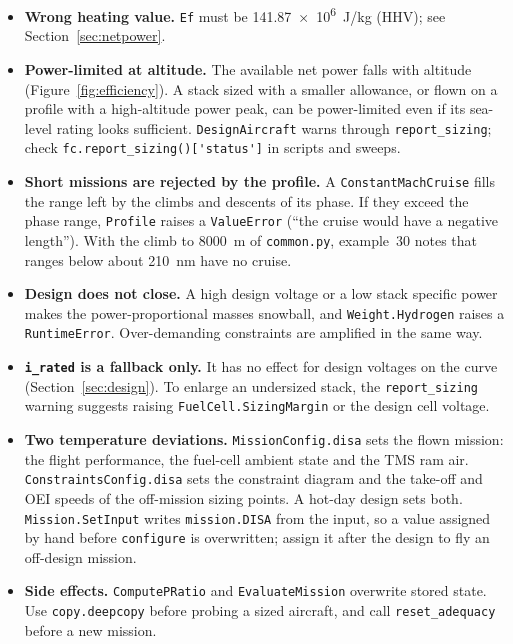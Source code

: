 \documentclass[a4paper,11pt]{article}
\newcommand{\code}[1]{\nolinkurl{#1}}
\newcommand{\fn}[1]{\nolinkurl{#1}}
\begin{document}
\begin{itemize}
  \item \textbf{Wrong heating value.} \code{Ef} must be \SI{141.87e6}{J/kg} (HHV); see
  Section~\ref{sec:netpower}.
  \item \textbf{Power-limited at altitude.} The available net power falls with altitude
  (Figure~\ref{fig:efficiency}). A stack sized with a smaller allowance, or flown on a profile
  with a high-altitude power peak, can be power-limited even if its sea-level rating looks
  sufficient. \fn{DesignAircraft} warns through \fn{report_sizing}; check
  \code{fc.report_sizing()['status']} in scripts and sweeps.
  \item \textbf{Short missions are rejected by the profile.} A \code{ConstantMachCruise} fills
  the range left by the climbs and descents of its phase. If they exceed the phase range,
  \fn{Profile} raises a \code{ValueError} (``the cruise would have a negative length''). With
  the climb to \SI{8000}{m} of \fn{common.py}, example~30 notes that ranges below about 210~nm
  have no cruise.
  \item \textbf{Design does not close.} A high design voltage or a low stack specific power
  makes the power-proportional masses snowball, and \fn{Weight.Hydrogen} raises a
  \code{RuntimeError}. Over-demanding constraints are amplified in the same way.
  \item \textbf{\code{i_rated} is a fallback only.} It has no effect for design voltages on
  the curve (Section~\ref{sec:design}). To enlarge an undersized stack, the
  \fn{report_sizing} warning suggests raising \code{FuelCell.SizingMargin} or the design
  cell voltage.
  \item \textbf{Two temperature deviations.} \code{MissionConfig.disa} sets the flown mission:
  the flight performance, the fuel-cell ambient state and the TMS ram air.
  \code{ConstraintsConfig.disa} sets the constraint diagram and the take-off and OEI speeds
  of the off-mission sizing points. A hot-day design sets both. \fn{Mission.SetInput} writes
  \code{mission.DISA} from the input, so a value assigned by hand before \code{configure} is
  overwritten; assign it after the design to fly an off-design mission.
  \item \textbf{Side effects.} \fn{ComputePRatio} and \fn{EvaluateMission} overwrite stored
  state. Use \code{copy.deepcopy} before probing a sized aircraft, and call
  \fn{reset_adequacy} before a new mission.
\end{itemize}
\end{document}
